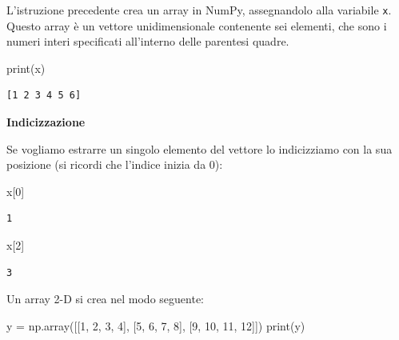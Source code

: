 \documentclass[
  letterpaper,
  krantz2]{{[}./krantz{]}}
\newenvironment{Shaded}{\begin{snugshade}}{\end{snugshade}}
\newcommand{\BuiltInTok}[1]{\textcolor[rgb]{0.00,0.23,0.31}{#1}}
\newcommand{\DecValTok}[1]{\textcolor[rgb]{0.68,0.00,0.00}{#1}}
\newcommand{\NormalTok}[1]{\textcolor[rgb]{0.00,0.23,0.31}{#1}}
\newcommand{\OperatorTok}[1]{\textcolor[rgb]{0.37,0.37,0.37}{#1}}
\begin{document}
L'istruzione precedente crea un array in NumPy, assegnandolo alla
variabile \texttt{x}. Questo array è un vettore unidimensionale
contenente sei elementi, che sono i numeri interi specificati
all'interno delle parentesi quadre.

\begin{Shaded}
\begin{Highlighting}[]
\BuiltInTok{print}\NormalTok{(x)}
\end{Highlighting}
\end{Shaded}

\begin{verbatim}
[1 2 3 4 5 6]
\end{verbatim}

\textbf{Indicizzazione}

Se vogliamo estrarre un singolo elemento del vettore lo indicizziamo con
la sua posizione (si ricordi che l'indice inizia da 0):

\begin{Shaded}
\begin{Highlighting}[]
\NormalTok{x[}\DecValTok{0}\NormalTok{]}
\end{Highlighting}
\end{Shaded}

\begin{verbatim}
1
\end{verbatim}

\begin{Shaded}
\begin{Highlighting}[]
\NormalTok{x[}\DecValTok{2}\NormalTok{]}
\end{Highlighting}
\end{Shaded}

\begin{verbatim}
3
\end{verbatim}

Un array 2-D si crea nel modo seguente:

\begin{Shaded}
\begin{Highlighting}[]
\NormalTok{y }\OperatorTok{=}\NormalTok{ np.array([[}\DecValTok{1}\NormalTok{, }\DecValTok{2}\NormalTok{, }\DecValTok{3}\NormalTok{, }\DecValTok{4}\NormalTok{], [}\DecValTok{5}\NormalTok{, }\DecValTok{6}\NormalTok{, }\DecValTok{7}\NormalTok{, }\DecValTok{8}\NormalTok{], [}\DecValTok{9}\NormalTok{, }\DecValTok{10}\NormalTok{, }\DecValTok{11}\NormalTok{, }\DecValTok{12}\NormalTok{]])}
\BuiltInTok{print}\NormalTok{(y)}
\end{Highlighting}
\end{Shaded}
\end{document}
